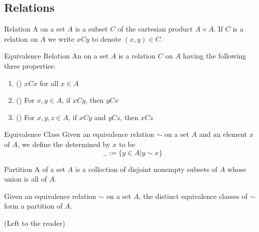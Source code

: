 \documentclass[12pt, a4paper, twoside, openright, titlepage]{book}
\begin{document}
\begin{appendices}
	\section{Relations}
    
    \begin{defn}{Relation}{}
        A  on a set $A$ is a subset $C$ of the cartesian product $A \times A$. If $C$ is a relation on $A$ we write $xCy$ to denote $(x,y) \in C$.
    \end{defn}
    

    \begin{defn}{Equivalence Relation}{}
        An  on a set $A$ is a relation $C$ on $A$ having the following three properties: \begin{enumerate}
            \item () $xCx$ for all $x \in A$
            \item () For $x,y \in A$, if $xCy$, then $yCx$
            \item () For $x,y,z \in A$, if $xCy$ and $yCz$, then $xCz$
        \end{enumerate}
    \end{defn}


    \begin{defn}{Equivalence Class}{}
        Given an equivalence relation $\sim$ on a set $A$ and an element $x$ of $A$, we define the  determined by $x$ to be \begin{equation}
            [x]_{\sim} := \{y \in A\vert y\sim x\}
        \end{equation}
    \end{defn}


    \begin{defn}{Partition}{}
        A  of a set $A$ is a collection of disjoint nonempty subsets of $A$ whose union is all of $A$.
    \end{defn}



    \begin{prop}{}{}
        Given an equivalence relation $\sim$ on a set $A$, the distinct equivalence classes of $\sim$ form a partition of $A$.
    \end{prop}
    \begin{proof*}{}{}
        (Left to the reader)
    \end{proof*}


\end{appendices}
\end{document}
